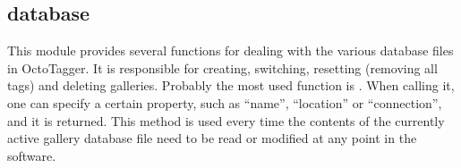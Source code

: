 \subsection{database}

This module provides several functions for dealing with the various database files in OctoTagger. It is responsible for creating, switching, resetting (removing all tags) and deleting galleries. Probably the most used function is . When calling it, one can specify a certain property, such as ``name'', ``location'' or ``connection'', and it is returned. This method is used every time the contents of the currently active gallery database file need to be read or modified at any point in the software.